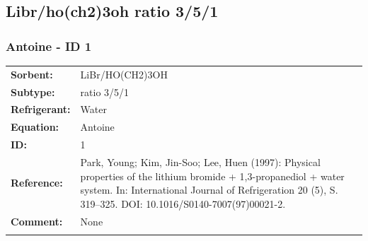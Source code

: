 \subsection{Libr/ho(ch2)3oh  ratio 3/5/1}
%
\subsubsection{Antoine - ID 1}
%
\begin{tabular}[l]{|lp{11.5cm}|}
\hline
\addlinespace

\textbf{Sorbent:} & LiBr/HO(CH2)3OH  \\
\textbf{Subtype:} & ratio 3/5/1 \\
\textbf{Refrigerant:} & Water \\
\textbf{Equation:} & Antoine \\
\textbf{ID:} & 1 \\
\textbf{Reference:} & Park, Young; Kim, Jin-Soo; Lee, Huen (1997): Physical properties of the lithium bromide + 1,3-propanediol + water system. In: International Journal of Refrigeration 20 (5), S. 319–325. DOI: 10.1016/S0140-7007(97)00021-2. \\
\textbf{Comment:} & None \\

\addlinespace
\hline
\end{tabular}
\newline

